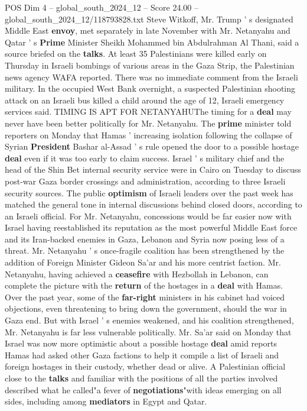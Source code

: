 \begin{textsample}{POS Dim 4 – global\_south\_2024\_12 – Score 24.00 – global\_south\_2024\_12/118793828.txt}
Steve Witkoff, Mr.
Trump ' s designated Middle East \textbf{envoy}, met separately in late November with Mr.
Netanyahu and Qatar ' s \textbf{Prime} Minister Sheikh Mohammed bin Abdulrahman Al Thani, said a source briefed on the \textbf{talks}.
At least 35 Palestinians were killed early on Thursday in Israeli bombings of various areas in the Gaza Strip, the Palestinian news agency WAFA reported.
There was no immediate comment from the Israeli military.
In the occupied West Bank overnight, a suspected Palestinian shooting attack on an Israeli bus killed a child around the age of 12, Israeli emergency services said.
TIMING IS APT FOR NETANYAHUThe timing for a \textbf{deal} may never have been better politically for Mr.
Netanyahu.
The \textbf{prime} minister told reporters on Monday that Hamas ' increasing isolation following the collapse of Syrian \textbf{President} Bashar al-Assad ' s rule opened the door to a possible hostage \textbf{deal} even if it was too early to claim success.
Israel ' s military chief and the head of the Shin Bet internal security service were in Cairo on Tuesday to discuss post-war Gaza border crossings and administration, according to three Israeli security sources.
The public \textbf{optimism} of Israeli leaders over the past week has matched the general tone in internal discussions behind closed doors, according to an Israeli official.
For Mr.
Netanyahu, concessions would be far easier now with Israel having reestablished its reputation as the most powerful Middle East force and its Iran-backed enemies in Gaza, Lebanon and Syria now posing less of a threat.
Mr.
Netanyahu ' s once-fragile coalition has been strengthened by the addition of Foreign Minister Gideon Sa'ar and his more centrist faction.
Mr.
Netanyahu, having achieved a \textbf{ceasefire} with Hezbollah in Lebanon, can complete the picture with the \textbf{return} of the hostages in a \textbf{deal} with Hamas.
Over the past year, some of the \textbf{far-right} ministers in his cabinet had voiced objections, even threatening to bring down the government, should the war in Gaza end.
But with Israel ' s enemies weakened, and his coalition strengthened, Mr.
Netanyahu is far less vulnerable politically.
Mr.
Sa'ar said on Monday that Israel was now more optimistic about a possible hostage \textbf{deal} amid reports Hamas had asked other Gaza factions to help it compile a list of Israeli and foreign hostages in their custody, whether dead or alive.
A Palestinian official close to the \textbf{talks} and familiar with the positions of all the parties involved described what he called"a fever of \textbf{negotiations}"with ideas emerging on all sides, including among \textbf{mediators} in Egypt and Qatar.

\end{textsample}
